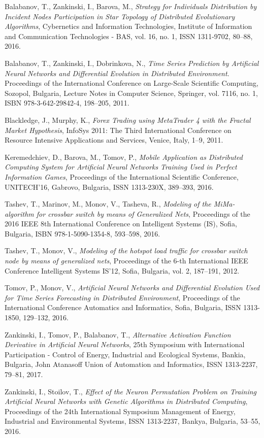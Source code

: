 \documentclass{llncs}
\begin{document}
\begin{thebibliography}{99}
 Balabanov, T., Zankinski, I., Barova, M., \textit{Strategy for Individuals Distribution by Incident Nodes Participation in Star Topology of Distributed Evolutionary Algorithms}, Cybernetics and Information Technologies, Institute of Information and Communication Technologies - BAS, vol. 16, no. 1, ISSN 1311-9702, 80--88, 2016.

 Balabanov, T., Zankinski, I., Dobrinkova, N., \textit{Time Series Prediction by Artificial Neural Networks and Differential Evolution in Distributed Environment}. Proceedings of the International Conference on Large-Scale Scientific Computing, Sozopol, Bulgaria, Lecture Notes in Computer Science, Springer, vol. 7116, no. 1, ISBN 978-3-642-29842-4, 198--205, 2011. 

 Blackledge, J., Murphy, K., \textit{Forex Trading using MetaTrader 4 with the Fractal Market Hypothesis}, InfoSys 2011: The Third International Conference on Resource Intensive Applications and Services, Venice, Italy, 1--9, 2011.

 Keremedchiev, D., Barova, M., Tomov, P., \textit{Mobile Application as Distributed Computing System for Artificial Neural Networks Training Used in Perfect Information Games}, Proceedings of the International Scientific Conference, UNITECH’16, Gabrovo, Bulgaria, ISSN 1313-230X, 389--393, 2016.

 Tashev, T., Marinov, M., Monov, V., Tasheva, R., \textit{Modeling of the MiMa-algorithm for crossbar switch by means of Generalized Nets}, Proceedings of the 2016 IEEE 8th International Conference on Intelligent Systems (IS), Sofia, Bulgaria, ISBN 978-1-5090-1354-8, 593--598, 2016.

 Tashev, T., Monov, V., \textit{Modeling of the hotspot load traffic for crossbar switch node by means of generalized nets}, Proceedings of the 6-th International IEEE Conference Intelligent Systems IS'12, Sofia, Bulgaria, vol. 2, 187--191, 2012.

 Tomov, P., Monov, V., \textit{Artificial Neural Networks and Differential Evolution Used for Time Series Forecasting in Distributed Environment}, Proceedings of the International Conference Automatics and Informatics, Sofia, Bulgaria, ISSN 1313-1850, 129--132, 2016.

 Zankinski, I., Tomov, P., Balabanov, T., \textit{Alternative Activation Function Derivative in Artificial Neural Networks}, 25th Symposium with International Participation - Control of Energy, Industrial and Ecological Systems, Bankia, Bulgaria, John Atanasoff Union of Automation and Informatics, ISSN 1313-2237, 79--81, 2017.

 Zankinski, I., Stoilov, T., \textit{Effect of the Neuron Permutation Problem on Training Artificial Neural Networks with Genetic Algorithms in Distributed Computing}, Proceedings of the 24th International Symposium Management of Energy, Industrial and Environmental Systems, ISSN 1313-2237, Bankya, Bulgaria, 53--55, 2016.

\end{thebibliography}
\end{document}
